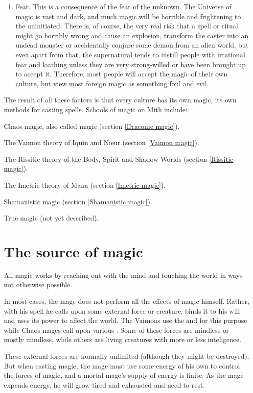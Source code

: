 \begin{enumerate}
	\item Fear. This is a consequence of the fear of the unknown. The Universe of magic is vast and dark, and much magic will be horrible and frightening to the uninitiated. There is, of course, the very real risk that a spell or ritual might go horribly wrong and cause an explosion, transform the caster into an undead monster or accidentally conjure some demon from an alien world, but even apart from that, the supernatural tends to instill people with irrational fear and loathing unless they are very strong-willed or have been brought up to accept it. Therefore, most people will accept the magic of their own culture, but view most foreign magic as something foul and evil. 
\end{enumerate}

The result of all these factors is that every culture has its own magic, its own methods for casting spells. Schools of magic on Mith include: 

\bi
  \item Chaos magic, also called \draconic{} magic (section \ref{Draconic magic}). 
  \item The Vaimon theory of Iquin and Nieur (section \ref{Vaimon magic}). 
  \item The Rissitic theory of the Body, Spirit and Shadow Worlds (section \ref{Rissitic magic}). 
  \item The Imetric theory of Mana (section \ref{Imetric magic}). 
  \item Shamanistic magic (section \ref{Shamanistic magic}).
  \item True \bane{} magic (not yet described).
\ei



\section{The source of magic}
All magic works by reaching out with the mind and touching the world in ways not otherwise possible. 

In most cases, the mage does not perform all the effects of magic himself. Rather, with his spell he calls upon some external force or creature, binds it to his will and uses its power to affect the world. The Vaimons use the \Sephiroth{} and \Kliffoth{} for this purpose while Chaos mages call upon various \daemons{}. Some of these forces are mindless or mostly mindless, while others are living creatures with more or less inteligence.

These external forces are normally unlimited (although they might be destroyed). But when casting magic, the mage must use some energy of his own to control the forces of magic, and a mortal mage's supply of energy is finite. As the mage expends energy, he will grow tired and exhausted and need to rest. 

